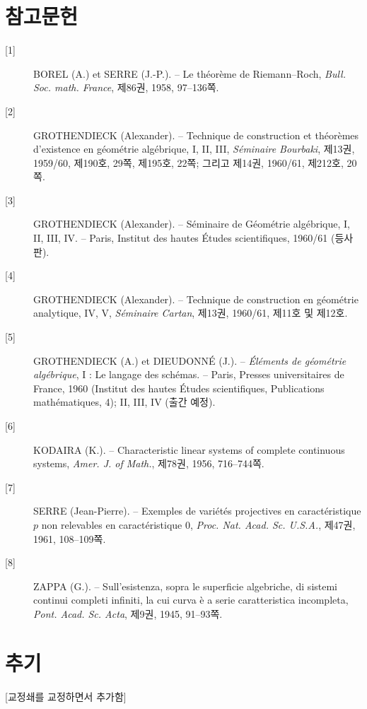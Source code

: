 \section*{참고문헌}

\begin{description}
\item[{[1]}] BOREL (A.) et SERRE (J.-P.). -- Le théorème de Riemann--Roch,
\emph{Bull. Soc. math. France}, 제86권, 1958, 97--136쪽.

\item[{[2]}] GROTHENDIECK (Alexander). -- Technique de construction et
théorèmes d'existence en géométrie algébrique, I, II, III, \emph{Séminaire
Bourbaki}, 제13권, 1959/60, 제190호, 29쪽, 제195호, 22쪽; 그리고 제14권,
1960/61, 제212호, 20쪽.

\item[{[3]}] GROTHENDIECK (Alexander). -- Séminaire de Géométrie algébrique,
I, II, III, IV. -- Paris, Institut des hautes Études scientifiques, 1960/61
(등사판).

\item[{[4]}] GROTHENDIECK (Alexander). -- Technique de construction en
géométrie analytique, IV, V, \emph{Séminaire Cartan}, 제13권, 1960/61,
제11호 및 제12호.

\item[{[5]}] GROTHENDIECK (A.) et DIEUDONNÉ (J.). -- \emph{Éléments de
géométrie algébrique}, I : Le langage des schémas. -- Paris, Presses
universitaires de France, 1960 (Institut des hautes Études scientifiques,
Publications mathématiques, 4); II, III, IV (출간 예정).

\item[{[6]}] KODAIRA (K.). -- Characteristic linear systems of complete
continuous systems, \emph{Amer. J. of Math.}, 제78권, 1956, 716--744쪽.

\item[{[7]}] SERRE (Jean-Pierre). -- Exemples de variétés projectives en
caractéristique $p$ non relevables en caractéristique 0, \emph{Proc. Nat. Acad.
Sc. U.S.A.}, 제47권, 1961, 108--109쪽.

\item[{[8]}] ZAPPA (G.). -- Sull'esistenza, sopra le superficie algebriche, di
sistemi continui completi infiniti, la cui curva è a serie caratteristica
incompleta, \emph{Pont. Acad. Sc. Acta}, 제9권, 1945, 91--93쪽.
\end{description}

\section*{추기}
\begin{center}
{\small [교정쇄를 교정하면서 추가함]}
\end{center}

